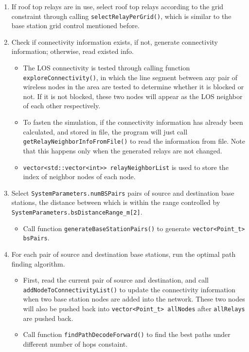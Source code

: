 \documentclass[paper=a4, fontsize=11pt]{scrartcl}
\numberwithin{equation}{section}		%
\numberwithin{figure}{section}			%
\numberwithin{table}{section}				%
\begin{document}
\begin{enumerate}
	\item If roof top relays are in use, select roof top relays according to the grid constraint through calling \verb|selectRelayPerGrid()|, which is similar to the base station grid control mentioned before.
	
	\item Check if connectivity information exists, if not, generate connectivity information; otherwise, read existed info.
	\begin{itemize}
		\item The LOS connectivity is tested through calling function \verb|exploreConnectivity()|, in which the line segment between any pair of wireless nodes in the area are tested to determine whether it is blocked or not. If it is not blocked, these two nodes will appear as the LOS neighbor of each other respectively.
		\item To fasten the simulation, if the connectivity information has already been calculated, and stored in file, the program will just call \verb|getRelayNeighborInfoFromFile()| to read the information from file. Note that this happens only when the generated relays are not changed.
		\item \verb|vector<std::vector<int>> relayNeighborList| is used to store the index of neighbor nodes of each node. 
	\end{itemize}
	
	\item Select \verb|SystemParameters.numBSPairs| pairs of source and destination base stations, the distance between which is within the range controlled by \verb|SystemParameters.bsDistanceRange_m[2]|.
	\begin{itemize}
		\item Call function \verb|generateBaseStationPairs()| to generate \verb|vector<Point_t> bsPairs|.
	\end{itemize}
	
	\item For each pair of source and destination base stations, run the optimal path finding algorithm.
	\begin{itemize}
		\item First, read the current pair of source and destination, and call \verb|addNodeToConnectivityList()| to update the connectivity information when two base station nodes are added into the network. These two nodes will also be pushed back into \verb|vector<Point_t> allNodes| after \verb|allRelays| are pushed back.
		\item Call function \verb|findPathDecodeForward()| to find the best paths under different number of hops constaint.
	\end{itemize}
	
\end{enumerate}
\end{document}
